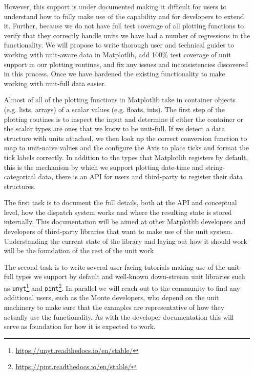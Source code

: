 \documentclass[12pt]{article}
\numberwithin{page}{section}
\begin{document}
However, this support is under documented making it difficult for
users to understand how to fully make use of the capability and for
developers to extend it.  Further, because we do not have full test
coverage of all plotting functions to verify that they correctly
handle units we have had a number of regressions in the functionality.
We will propose to write thorough user and technical guides to working
with unit-aware data in Matplotlib, add 100\% test coverage of unit
support in our plotting routines, and fix any issues and
inconsistencies discovered in this process.  Once we have hardened the
existing functionality to make working with unit-full data easier.

Almost of all of the plotting functions in Matplotlib take in
container objects (e.g. lists, arrays) of a scalar values
(e.g. floats, ints).  The first step of the plotting routines is to
inspect the input and determine if either the container or the scalar
types are ones that we know to be unit-full.  If we detect a data
structure with units attached, we then look up the correct conversion
function to map to unit-naive values and the configure the Axis to
place ticks and format the tick labels correctly.  In addition to the
types that Matplotlib registers by default, this is the mechanism by
which we support plotting date-time and string-categorical data, there
is an API for users and third-party to register their data structures.

The first task is to document the full details, both at the API and
conceptual level, how the dispatch system works and where the
resulting state is stored internally.  This documentation will be
aimed at other Matplotlib developers and developers of third-party
libraries that want to make use of the unit system.  Understanding the
current state of the library and laying out how it should work will be
the foundation of the rest of the unit work

The second task is to write several user-facing tutorials making use
of the unit-full types we support by default and well-known
down-stream unit libraries such as
\texttt{unyt}\footnote{\url{https://unyt.readthedocs.io/en/stable/}}
and
\texttt{pint}\footnote{\url{https://pint.readthedocs.io/en/stable/}}.
In parallel we will reach out to the community to find any additional
users, such as the Monte developers, who depend on the unit machinery
to make sure that the examples are representative of how they actually
use the functionality.  As with the developer documentation this will
serve as foundation for how it is expected to work.
\end{document}

